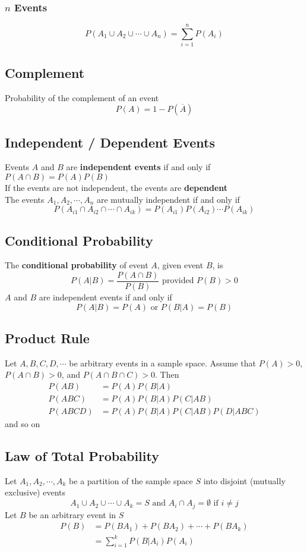\documentclass[11pt]{article}
\begin{document}
\subsubsection{$n$ Events}
\[P(A_1\cup A_2\cup \cdots \cup A_n) = \sum_{i=1}^{n}P(A_i)\]
\subsection{Complement}
Probability of the complement of an event \[P(A) = 1-P(\overline{A})\]
\subsection{Independent / Dependent Events}
Events $A$ and $B$ are \textbf{independent events} if and only if $P(A\cap B) = P(A)P(B)$ \\
If the events are not independent, the events are \textbf{dependent} \\
The events $A_1, A_2, \cdots, A_n$ are mutually independent if and only if 
\[P(A_{i1}\cap A_{i2}\cap\cdots\cap A_{ik}) = P(A_{i1})P(A_{i2})\cdots P(A_{ik})\]
\subsection{Conditional Probability}
The \textbf{conditional probability} of event $A$, given event $B$, is \[P(A|B) = \frac{P(A\cap B)}{P(B)}\text{ provided }P(B)>0\]
$A$ and $B$ are independent events if and only if \[P(A|B) = P(A) \text{ or } P(B|A) = P(B)\]
\subsection{Product Rule}
Let $A,B,C,D,\cdots$ be arbitrary events in a sample space. Assume that $P(A)>0$, $P(A\cap B)>0$, and $P(A\cap B\cap C) > 0$. Then 
\begin{align*}
    P(AB) &= P(A)P(B|A) \\
    P(ABC) &= P(A)P(B|A)P(C|AB) \\
    P(ABCD) &= P(A)P(B|A)P(C|AB)P(D|ABC)
\end{align*}
and so on 
\subsection{Law of Total Probability}
Let $A_1, A_2, \cdots, A_k$ be a partition of the sample space $S$ into disjoint (mutually exclusive) events 
\[A_1\cup A_2\cup \cdots\cup A_k = S\text{ and }A_i\cap A_j = \emptyset\text{ if }i\neq j\]
Let $B$ be an arbitrary event in $S$ 
\begin{align*}
    P(B) &= P(BA_1) + P(BA_2) + \cdots + P(BA_k) \\
         &= \sum_{i=1}^{k}P(B|A_i)P(A_i)
\end{align*}
\end{document}
